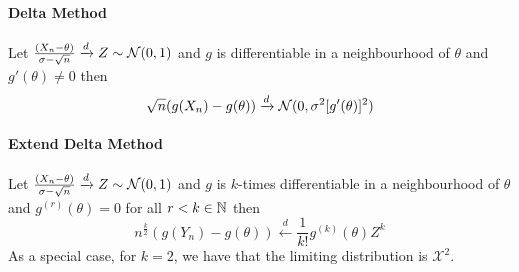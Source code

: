 \paragraph{Delta Method}
Let \(\frac{(X_n - \theta)}{\sigma - \sqrt{n}} \xrightarrow{d} Z \sim \mathcal{N}(0,1)\) and \(g\) is differentiable in a neighbourhood of \(\theta\) and \(g'(\theta) \neq 0\) then
\[\sqrt{n}(g(X_n) - g(\theta)) \xrightarrow{d} \mathcal{N}(0, \sigma^2[g'(\theta)]^2)\]

\paragraph{Extend Delta Method}
Let \(\frac{(X_n - \theta)}{\sigma - \sqrt{n}} \xrightarrow{d} Z \sim \mathcal{N}(0,1)\) and \(g\) is \(k\)-times differentiable in a neighbourhood of \(\theta\) and \(g^{(r)}(\theta) = 0\) for all \(r < k \in \mathbb{N}\) then
\[n^{\frac{k}{2}}(g(Y_n) - g(\theta)) \xleftarrow{d} \frac{1}{k!}g^{(k)}(\theta)Z^k\]
As a special case, for \(k = 2\), we have that the limiting distribution is \(\mathcal{X}^2\).